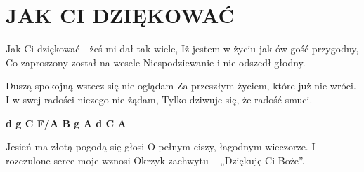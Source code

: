\documentclass[../../../songbook.tex]{subfiles}
\begin{document}
\TabPositions{8cm} %
\section*{JAK CI DZIĘKOWAĆ}
\vspace{0.5cm}
Jak Ci dziękować - żeś mi dał tak wiele,	  \newline
Iż jestem w życiu jak ów gość przygodny,	  \newline
Co zaproszony został na wesele			 \newline
Niespodziewanie i nie odszedł głodny.		 \newline

Duszą spokojną wstecz się nie oglądam		\newline
Za przeszłym życiem, które już nie wróci.	\newline
I w swej radości niczego nie żądam,			\newline
Tylko dziwuje się, że radość smuci.		 \newline
 	
{\color{red}\textbf{d g C  F/A  B g A d C A} } \newline	

Jesień ma złotą pogodą się głosi			\newline	
O pełnym ciszy, łagodnym wieczorze.		\newline
I rozczulone serce moje wznosi			\newline
Okrzyk zachwytu – „Dziękuję Ci Boże”.		 \newline
\end{document}
